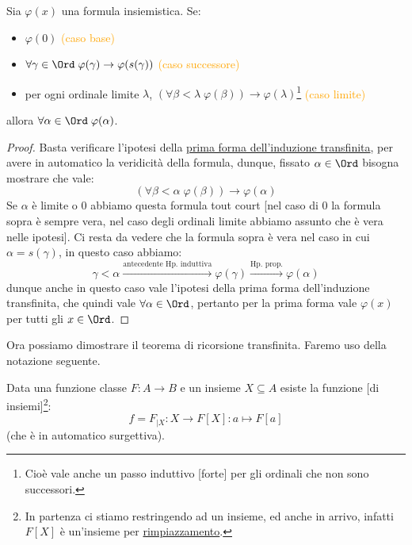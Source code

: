 \documentclass[11pt]{scrartcl}
\begin{document}
\begin{proposition}
	\label{induz_transf2}
	Sia $\varphi(x)$ una formula insiemistica. Se:
	\begin{itemize}
		\item $\varphi(0)$ \textcolor{orange}{(caso base)}
		\item $\forall \gamma \in \Ord \; \varphi(\gamma) \rightarrow \varphi(s(\gamma))$ \textcolor{orange}{(caso successore)}
		\item per ogni ordinale limite $\lambda$, $(\forall \beta < \lambda \; \varphi(\beta)) \rightarrow \varphi(\lambda)$\footnote{Cioè vale anche un passo induttivo [forte] per gli ordinali che non sono successori.} \textcolor{orange}{(caso limite)}
	\end{itemize}
	allora $\forall \alpha \in \Ord \; \varphi(\alpha)$.
\end{proposition}

\begin{proof}
	Basta verificare l'ipotesi della \hyperref[induz_transf1]{prima forma dell'induzione transfinita}, per avere in automatico la veridicità della formula, dunque, fissato $\alpha \in \Ord$ bisogna mostrare che vale:
	\[ (\forall \beta < \alpha \; \varphi(\beta)) \rightarrow \varphi(\alpha)
		\]
	Se $\alpha$ è limite o $0$ abbiamo questa formula tout court [nel caso di 0 la formula sopra è sempre vera, nel caso degli ordinali limite abbiamo assunto che è vera nelle ipotesi]. Ci resta da vedere che la formula sopra è vera nel caso in cui $\alpha = s(\gamma)$, in questo caso abbiamo:
	\[ \gamma < \alpha \overset{\text{antecedente Hp. induttiva}}{\rightarrow} \varphi(\gamma) \overset{\text{Hp. prop.}}{\rightarrow} \varphi(\alpha)
		\]
	dunque anche in questo caso vale l'ipotesi della prima forma dell'induzione transfinita, che quindi vale $\forall \alpha \in \Ord$, pertanto per la prima forma vale $\varphi(x)$ per tutti gli $x \in \Ord$.
\end{proof}

Ora possiamo dimostrare il teorema di ricorsione transfinita. Faremo uso della notazione seguente.

\begin{notation}
	Data una funzione classe $F : A \rightarrow B$ e un insieme $X \subseteq A$ esiste la funzione [di insiemi]\footnote{In partenza ci stiamo restringendo ad un insieme, ed anche in arrivo, infatti $F[X]$ è un'insieme per \hyperref[ax8]{rimpiazzamento}.}:
	\[ f = F_{|X} : X \rightarrow F[X] : a \mapsto F[a]
		\]
	(che è in automatico surgettiva).
\end{notation}
\end{document}
